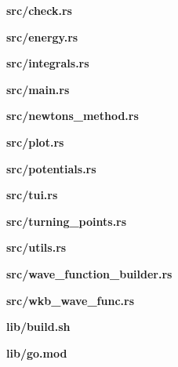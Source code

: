 \documentclass[11pt,DIV=10,final]{scrreprt} %
\begin{document}
\begin{appendix}
\vspace*{3ex}
{\noindent \large \bfseries src/check.rs}


\vspace*{3ex}
{\noindent \large \bfseries src/energy.rs}


\vspace*{3ex}
{\noindent \large \bfseries src/integrals.rs}


\vspace*{3ex}
{\noindent \large \bfseries src/main.rs}


\vspace*{3ex}
{\noindent \large \bfseries src/newtons\_method.rs}


\vspace*{3ex}
{\noindent \large \bfseries src/plot.rs}


\vspace*{3ex}
{\noindent \large \bfseries src/potentials.rs}


\vspace*{3ex}
{\noindent \large \bfseries src/tui.rs}


\vspace*{3ex}
{\noindent \large \bfseries src/turning\_points.rs}


\vspace*{3ex}
{\noindent \large \bfseries src/utils.rs}


\vspace*{3ex}
{\noindent \large \bfseries src/wave\_function\_builder.rs}


\vspace*{3ex}
{\noindent \large \bfseries src/wkb\_wave\_func.rs}


\vspace*{3ex}
{\noindent \large \bfseries lib/build.sh}


\vspace*{3ex}
{\noindent \large \bfseries lib/go.mod}



\end{appendix}
\end{document}
